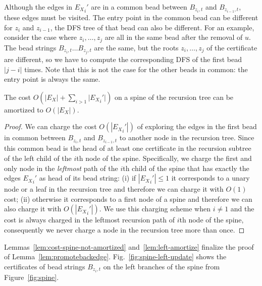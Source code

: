 Although the edges in ${E_X}_i'$ are in a common bead between
$B_{z_i,t}$ and $B_{z_{i-1},t}$, these edges must be visited. The
entry point in the common bead can be different for $z_i$ and
$z_{i-1}$, the DFS tree of that bead can also be different. For an
example, consider the case where $z_i, \ldots, z_j$ are all in the
same bead after the removal of $u$. The bead strings $B_{z_i,t} \ldots
B_{z_j,t}$ are the same, but the roots $z_i, \ldots, z_j$ of the
certificate are different, so we have to compute the corresponding DFS
of the first bead $|j-i|$ times. Note that this is not the case for
the other beads in common: the entry point is always the same.

\begin{lemma}
	The cost $O(|E_X| + \sum_{i>1}{|{E_X}_i'}|)$ on a spine of the
	recursion tree can be amortized to $O(|E_X|)$.
	\label{lem:left-amortize}
\end{lemma}
\begin{proof}
	We can charge the cost $O(|{E_X}_i'|)$ of exploring the edges
	in the first bead in common between $B_{z_i,t}$ and
	$B_{z_{i-1},t}$ to another node in the recursion tree. Since
	this common bead is the head of at least one certificate in
	the recursion subtree of the left child of the $i$th node of
	the spine.  Specifically, we charge the first and only node in
	the \emph{leftmost} path of the $i$th child of the spine that
	has exactly the edges ${E_X}_i'$ as head of its bead string:
	(i) if $|{E_X}_i'| \le 1$ it corresponds to a unary node or a
	leaf in the recursion tree and therefore we can charge it with
	$O(1)$ cost; (ii) otherwise it corresponds to a first node of
	a spine and therefore we can also charge it with
	$O(|{E_X}_i'|)$. We use this charging scheme when $i \neq 1$
	and the cost is always charged in the leftmost recursion path
	of $i$th node of the spine, consequently we never charge a
	node in the recursion tree more than once. 
\end{proof}

Lemmas~\ref{lem:cost-spine-not-amortized} and~\ref{lem:left-amortize}
finalize the proof of Lemma~\ref{lem:promotebackedge}. 
Fig.~\ref{fig:spine-left-update} shows the certificates of bead strings
$B_{z_i,t}$ on the left branches of the spine from
Figure~\ref{fig:spine}.




